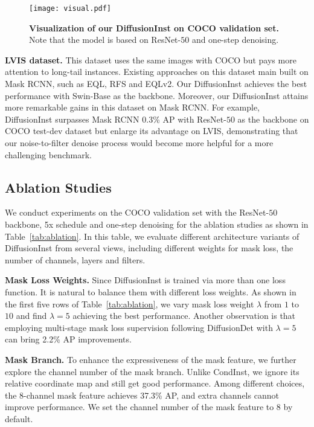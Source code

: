 \documentclass{article}
\begin{document}
\begin{figure*}[t!]
\centering
\texttt{[image: visual.pdf]}
\caption{\textbf{Visualization of our DiffusionInst on COCO validation set.} Note that the model is based on ResNet-$50$ and one-step denoising.}
\label{visualizations}
\end{figure*}

\noindent\textbf{LVIS dataset.} This dataset uses the same images with COCO but pays more attention to long-tail instances. Existing approaches on this dataset main built on Mask RCNN, such as EQL\cite{tan2020equalization}, RFS\cite{LVIS} and EQLv2\cite{tan2021equalization}. Our DiffusionInst achieves the best performance with Swin-Base as the backbone. Moreover, our DiffusionInst attains more remarkable gains in this dataset on Mask RCNN. For example, DiffusionInst surpasses Mask RCNN 0.3\% AP with ResNet-$50$ as the backbone on COCO test-dev dataset but enlarge its advantage on LVIS, demonstrating that our noise-to-filter denoise process would become more helpful for a more challenging benchmark.



\subsection{Ablation Studies}

We conduct experiments on the COCO validation set with the ResNet-$50$ backbone, 5x schedule and one-step denoising for the ablation studies as shown in Table~\ref{tab:ablation}. In this table, we evaluate different architecture variants of DiffusionInst from several views, including different weights for mask loss, the number of channels, layers and filters.

\noindent\textbf{Mask Loss Weights.} Since DiffusionInst is trained via more than one loss function. It is natural to balance them with different loss weights. As shown in the first five rows of Table~\ref{tab:ablation}, we vary mask loss weight $\lambda$ from $1$ to $10$ and find $\lambda=5$ achieving the best performance. Another observation is that employing multi-stage mask loss supervision following DiffusionDet with $\lambda=5$ can bring 2.2\% AP improvements.


\noindent\textbf{Mask Branch.} To enhance the expressiveness of the mask feature, we further explore the channel number of the mask branch. Unlike CondInst, we ignore its relative coordinate map and still get good performance. 
Among different choices, the 8-channel mask feature achieves 37.3\% AP, and extra channels cannot improve performance. We set the channel number of the mask feature to 8 by default. 
\end{document}
